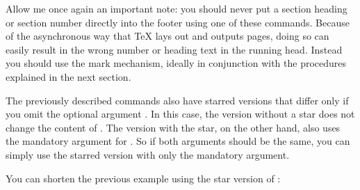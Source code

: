 Allow me once again an important note: you should never
put a section heading or section number directly into the footer using one of
these commands. Because of the asynchronous way that \TeX{} lays out and
outputs pages, doing so can easily result in the wrong number or heading text
in the running head. Instead you should use the mark mechanism, ideally in
conjunction with the procedures explained in the next section.%
\EndIndexGroup


\begin{Declaration}
\end{Declaration}
The previously described commands also have starred
versions that differ only if you
omit the optional argument . In this
case, the version without a star does not change the content of
. The version with the star,
on the other hand, also uses the mandatory argument  for . So if both
arguments should be the same, you can simply use the starred version with only
the mandatory argument.%

\begin{Example}
  You can shorten the previous example using the star version of
  :
%
\end{Example}%
\EndIndexGroup


